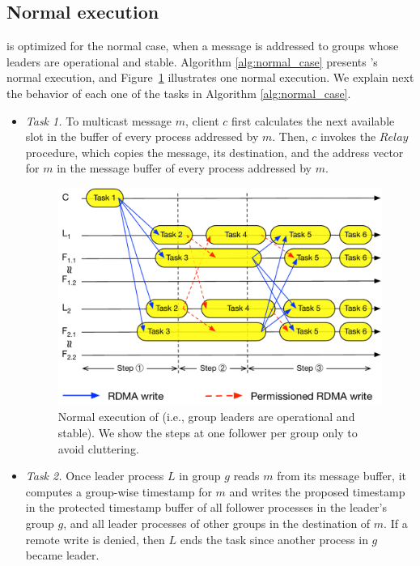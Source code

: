 \subsection{Normal execution}
\label{sec:normalcase}

\libname is optimized for the normal case, when a message is addressed to groups whose leaders are operational and stable.
Algorithm \ref{alg:normal_case} presents \libname's normal execution, and 
Figure~\ref{fig:normal_operation_time} illustrates one normal execution.
We explain next the behavior of each one of the tasks in Algorithm \ref{alg:normal_case}.

\begin{itemize}
\item \emph{Task 1.} To multicast message $m$, client $c$ first calculates the next available slot in the buffer of every process addressed by $m$. Then, $c$ invokes the $Relay$ procedure, which copies the message, its destination, and the address vector for $m$ in the message buffer of every process addressed by $m$.

\begin{figure}[ht!]
  \centering
  \includegraphics[width=1\linewidth]{figures/execution}
  \caption{Normal execution of \libname (i.e., group leaders are operational and stable). We show the steps at one follower per group only to avoid cluttering.}
  \label{fig:normal_operation_time}
\end{figure}

\item \emph{Task 2.} Once leader process $L$ in group $g$ reads $m$ from its message buffer, it computes a
group-wise timestamp for $m$ and writes the proposed timestamp 
in the protected timestamp buffer of all follower processes in the leader's group $g$, and all leader processes 
of other groups in the destination of $m$.
If a remote write is denied, then $L$ ends the task since another process in $g$ became leader.


\end{itemize}
